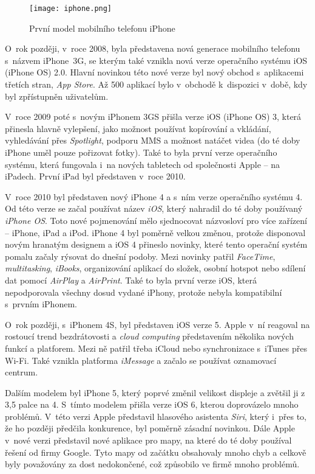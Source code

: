 \begin{figure}[h]
	\centering
	\texttt{[image: iphone.png]}
	\caption{První model mobilního telefonu iPhone \cite{iphone-review}}
\end{figure}

O~rok později, v~roce 2008, byla představena nová generace mobilního telefonu s~názvem iPhone~3G, se kterým také vznikla nová verze operačního systému iOS (iPhone OS) 2.0. Hlavní novinkou této nové verze byl nový obchod s~aplikacemi třetích stran, \emph{App Store}. Až 500 aplikací bylo v~obchodě k~dispozici v~době, kdy byl zpřístupněn uživatelům.

V~roce 2009 poté s~novým iPhonem 3GS přišla verze iOS (iPhone OS) 3, která přinesla hlavně vylepšení, jako možnost používat kopírování a vkládání, vyhledávání přes \emph{Spotlight}, podporu MMS a možnost natáčet videa (do té doby iPhone uměl pouze pořizovat fotky). Také to byla první verze operačního systému, která fungovala i~na nových tabletech od společnosti Apple – na iPadech. První iPad byl představen v~roce 2010.

V~roce 2010 byl představen nový iPhone 4 a s~ním verze operačního systému 4. Od této verze se začal používat název \emph{iOS}, který nahradil do té doby používaný \emph{iPhone OS}. Toto nové pojmenování mělo sjednocovat názvosloví pro více zařízení – iPhone, iPad a iPod. iPhone 4 byl poměrně velkou změnou, protože disponoval novým hranatým designem a iOS 4 přineslo novinky, které tento operační systém pomalu začaly rýsovat do dnešní podoby. Mezi novinky patřil \emph{FaceTime}, \emph{multitasking}, \emph{iBooks}, organizování aplikací do složek, osobní hotspot nebo sdílení dat pomocí \emph{AirPlay} a \emph{AirPrint}. Také to byla první verze iOS, která nepodporovala všechny dosud vydané iPhony, protože nebyla kompatibilní s~prvním iPhonem.

O~rok později, s~iPhonem 4S, byl představen iOS verze 5. Apple v~ní reagoval na rostoucí trend bezdrátovosti a \emph{cloud computing} představením několika nových funkcí a platforem. Mezi ně patřil třeba iCloud nebo synchronizace s~iTunes přes Wi-Fi. Také vznikla platforma \emph{iMessage} a začalo se používat oznamovací centrum.

Dalším modelem byl iPhone 5, který poprvé změnil velikost displeje a zvětšil ji z 3,5 palce na 4. S~tímto modelem přišla verze iOS 6, kterou doprovázelo mnoho problémů. V~této verzi Apple představil hlasového asistenta \emph{Siri}, který i~přes to, že ho později předčila konkurence, byl poměrně zásadní novinkou. Dále Apple v~nové verzi představil nové aplikace pro mapy, na které do té doby používal řešení od firmy Google. Tyto mapy od začátku obsahovaly mnoho chyb a celkově byly považovány za dost nedokončené, což způsobilo ve firmě mnoho problémů.

